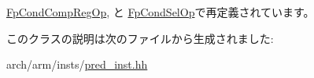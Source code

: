 \hyperlink{classArmISA_1_1FpCondCompRegOp_a273dc0fe84de8f4a9cf52aaf8dc27885}{FpCondCompRegOp}, と \hyperlink{classArmISA_1_1FpCondSelOp_a273dc0fe84de8f4a9cf52aaf8dc27885}{FpCondSelOp}で再定義されています。

このクラスの説明は次のファイルから生成されました:\begin{DoxyCompactItemize}
\item 
arch/arm/insts/\hyperlink{pred__inst_8hh}{pred\_\-inst.hh}\end{DoxyCompactItemize}
